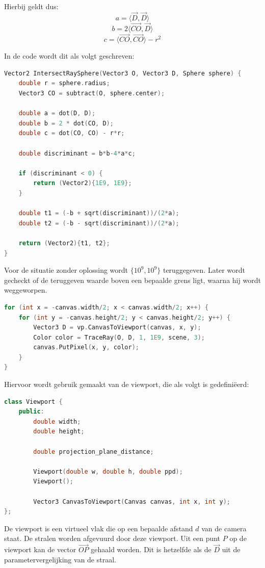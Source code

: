 \documentclass[12pt, a4paper]{article}
\begin{document}
Hierbij geldt dus:
\[a=\langle \overrightarrow{D},\overrightarrow{D}\rangle\]
\[b=2\langle \overrightarrow{CO},\overrightarrow{D}\rangle\]
\[c=\langle \overrightarrow{CO},\overrightarrow{CO}\rangle-r^2\]

In de code wordt dit als volgt geschreven:
\begin{lstlisting}[language=C++]
Vector2 IntersectRaySphere(Vector3 O, Vector3 D, Sphere sphere) {
    double r = sphere.radius;
    Vector3 CO = subtract(O, sphere.center);

    double a = dot(D, D);
    double b = 2 * dot(CO, D);
    double c = dot(CO, CO) - r*r;

    double discriminant = b*b-4*a*c;

    if (discriminant < 0) {
        return (Vector2){1E9, 1E9};
    }

    double t1 = (-b + sqrt(discriminant))/(2*a);
    double t2 = (-b - sqrt(discriminant))/(2*a);

    return (Vector2){t1, t2};
}
\end{lstlisting}

Voor de situatie zonder oplossing wordt $\{10^9,10^9\}$ teruggegeven. Later wordt gecheckt of de teruggeven waarde boven een bepaalde grens ligt, waarna hij wordt weggeworpen.

\begin{lstlisting}[language=C++]
for (int x = -canvas.width/2; x < canvas.width/2; x++) {
    for (int y = -canvas.height/2; y < canvas.height/2; y++) {
        Vector3 D = vp.CanvasToViewport(canvas, x, y);
        Color color = TraceRay(O, D, 1, 1E9, scene, 3);
        canvas.PutPixel(x, y, color);
    }
}
\end{lstlisting}

Hiervoor wordt gebruik gemaakt van de viewport, die als volgt is gedefiniëerd:
\begin{lstlisting}[language=C++]
class Viewport {
    public:
        double width;
        double height;

        double projection_plane_distance;

        Viewport(double w, double h, double ppd);
        Viewport();

        Vector3 CanvasToViewport(Canvas canvas, int x, int y);
};
\end{lstlisting}

De viewport is een virtueel vlak die op een bepaalde afstand $d$ van de camera staat. De stralen worden afgevuurd door deze viewport. Uit een punt $P$ op de viewport kan de vector $\overrightarrow{OP}$ gehaald worden. Dit is hetzelfde als de $\overrightarrow{D}$ uit de parametervergelijking van de straal.
\end{document}
